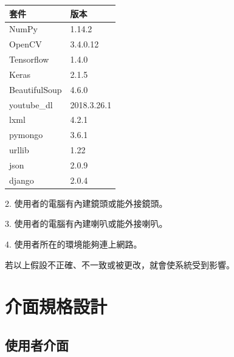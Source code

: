 \documentclass[12pt]{scrreprt}
\begin{document}
\begin{center}  
\begin{tabular}{|p{5cm}|p{5cm}|}\hline
套件 & 版本   \\ \hline  
NumPy&1.14.2\\ \hline  
OpenCV&3.4.0.12\\ \hline
Tensorflow&1.4.0\\ \hline
Keras&2.1.5\\ \hline
BeautifulSoup&4.6.0\\ \hline
youtube_dl&2018.3.26.1\\ \hline
lxml&4.2.1\\ \hline
pymongo&3.6.1\\ \hline
urllib&1.22\\ \hline
json&2.0.9\\ \hline
django&2.0.4\\ \hline
\end{tabular}  
\end{center}  

2. 使用者的電腦有內建鏡頭或能外接鏡頭。

3. 使用者的電腦有內建喇叭或能外接喇叭。

4. 使用者所在的環境能夠連上網路。

若以上假設不正確、不一致或被更改，就會使系統受到影響。



\chapter{介面規格設計}

\section{使用者介面}
\end{document}
